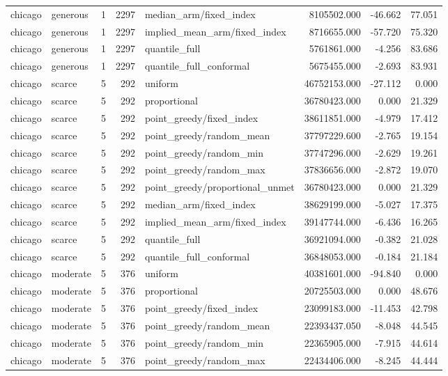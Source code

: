 \begin{tabular}{llrrlrrr}
chicago & generous & 1 & 2297 & median\_arm/fixed\_index & 8105502.000 & -46.662 & 77.051 \\
chicago & generous & 1 & 2297 & implied\_mean\_arm/fixed\_index & 8716655.000 & -57.720 & 75.320 \\
chicago & generous & 1 & 2297 & quantile\_full & 5761861.000 & -4.256 & 83.686 \\
chicago & generous & 1 & 2297 & quantile\_full\_conformal & 5675455.000 & -2.693 & 83.931 \\
chicago & scarce & 5 & 292 & uniform & 46752153.000 & -27.112 & 0.000 \\
chicago & scarce & 5 & 292 & proportional & 36780423.000 & 0.000 & 21.329 \\
chicago & scarce & 5 & 292 & point\_greedy/fixed\_index & 38611851.000 & -4.979 & 17.412 \\
chicago & scarce & 5 & 292 & point\_greedy/random\_mean & 37797229.600 & -2.765 & 19.154 \\
chicago & scarce & 5 & 292 & point\_greedy/random\_min & 37747296.000 & -2.629 & 19.261 \\
chicago & scarce & 5 & 292 & point\_greedy/random\_max & 37836656.000 & -2.872 & 19.070 \\
chicago & scarce & 5 & 292 & point\_greedy/proportional\_unmet & 36780423.000 & 0.000 & 21.329 \\
chicago & scarce & 5 & 292 & median\_arm/fixed\_index & 38629199.000 & -5.027 & 17.375 \\
chicago & scarce & 5 & 292 & implied\_mean\_arm/fixed\_index & 39147744.000 & -6.436 & 16.265 \\
chicago & scarce & 5 & 292 & quantile\_full & 36921094.000 & -0.382 & 21.028 \\
chicago & scarce & 5 & 292 & quantile\_full\_conformal & 36848053.000 & -0.184 & 21.184 \\
chicago & moderate & 5 & 376 & uniform & 40381601.000 & -94.840 & 0.000 \\
chicago & moderate & 5 & 376 & proportional & 20725503.000 & 0.000 & 48.676 \\
chicago & moderate & 5 & 376 & point\_greedy/fixed\_index & 23099183.000 & -11.453 & 42.798 \\
chicago & moderate & 5 & 376 & point\_greedy/random\_mean & 22393437.050 & -8.048 & 44.545 \\
chicago & moderate & 5 & 376 & point\_greedy/random\_min & 22365905.000 & -7.915 & 44.614 \\
chicago & moderate & 5 & 376 & point\_greedy/random\_max & 22434406.000 & -8.245 & 44.444 \\

\end{tabular}
